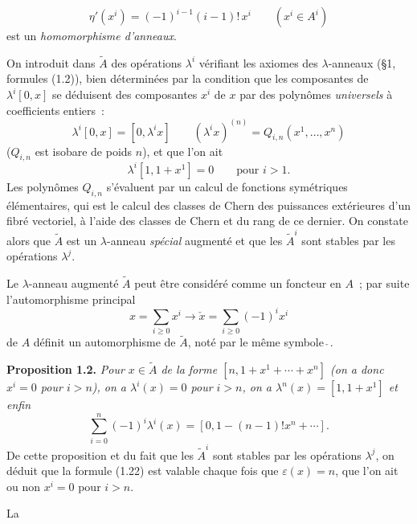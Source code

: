 \begin{equation}\tag{1.19}
\eta'(x^i)=(-1)^{i-1}(i-1)!\,x^i\qquad (x^i\in A^i)
\end{equation}
est un \emph{homomorphisme d'anneaux}.

On introduit dans $\widetilde A$ des opérations $\lambda^i$ vérifiant les axiomes des $\lambda$-anneaux (\S 1, formules (1.2)), bien déterminées par la condition que les composantes de $\lambda^i[0,x]$ se déduisent des composantes $x^i$ de $x$ par des polynômes \emph{universels} à coefficients entiers~:
\begin{equation}\tag{1.20}
\lambda^i[0,x]=[0,\lambda^i x]\qquad (\lambda^i x)^{(n)}=Q_{i,n}(x^1,\ldots,x^n)
\end{equation}
($Q_{i,n}$ est isobare de poids $n$), et que l'on ait
\begin{equation}\tag{1.21}
\lambda^i[1,1+x^1]=0\qquad\text{pour }i>1.
\end{equation}
Les polynômes $Q_{i,n}$ s'évaluent par un calcul de fonctions symétriques élémentaires, qui est le calcul des classes de Chern des puissances extérieures d'un fibré vectoriel, à l'aide des classes de Chern et du rang de ce dernier. On constate alors que $\widetilde A$ est un $\lambda$-anneau \emph{spécial} augmenté et que les $\widetilde A^i$ sont stables par les opérations $\lambda^j$.

Le $\lambda$-anneau augmenté $\widetilde A$ peut être considéré comme un foncteur en $A$~; par suite l'automorphisme principal
\[
x=\sum_{i\geq0}x^i\longrightarrow \check x=\sum_{i\geq0}(-1)^i x^i
\]
de $A$ définit un automorphisme de $\widetilde A$, noté par le même symbole $\check{\ }$.

\textbf{Proposition 1.2.} \emph{Pour $x\in\widetilde A$ de la forme $[n,1+x^1+\cdots+x^n]$ (on a donc $x^i=0$ pour $i>n$), on a $\lambda^i(x)=0$ pour $i>n$, on a $\lambda^n(x)=[1,1+x^1]$ et enfin}
\begin{equation}\tag{1.22}
\sum_{i=0}^n(-1)^i\lambda^i(x)=[0,1-(n-1)!x^n+\cdots].
\end{equation}
De cette proposition et du fait que les $\widetilde A^i$ sont stables par les opérations $\lambda^j$, on déduit que la formule (1.22) est valable chaque fois que $\varepsilon(x)=n$, que l'on ait ou non $x^i=0$ pour $i>n$.

La
